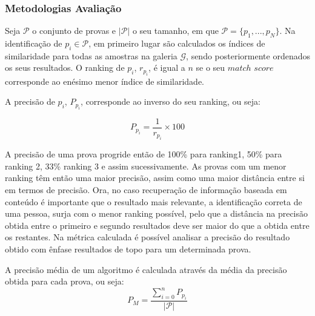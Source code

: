 \subsubsection{Metodologias Avaliação}
Seja $\mathscr{P}$ o conjunto de provas e $|\mathscr{P}|$ o seu tamanho, em que $\mathscr{P} = \{p_1, ..., p_N\}$. Na identificação de $p_i \in \mathscr{P}$, em primeiro lugar são calculados os índices de similaridade para todas as amostras na galeria $\mathscr{G}$, sendo posteriormente ordenados os seus resultados. O ranking de $p_i$, $r_{p_i}$, é igual a $n$ se o seu $match$ $score$ corresponde ao enésimo menor índice de similaridade.

A precisão de $p_i$, $P_{p_i}$, corresponde ao inverso do seu ranking, ou seja:

\begin{equation}
P_{p_i} = \frac{1}{r_{p_i}} \times 100
\end{equation}

A precisão de uma prova progride então de 100\% para ranking1, 50\% para ranking 2, 33\% ranking 3 e assim sucessivamente. As provas com um menor ranking têm então uma maior precisão, assim como uma maior distância entre si em termos de precisão. Ora, no caso recuperação de informação baseada em conteúdo é importante que o resultado mais relevante, a identificação correta de uma pessoa, surja com o menor ranking possível, pelo que a distância na precisão obtida entre o primeiro e segundo resultados deve ser maior do que a obtida entre os restantes. Na métrica calculada é possível analisar a precisão do resultado obtido com ênfase resultados de topo para um determinada prova.

A precisão média de um algoritmo é calculada através da média da precisão obtida para cada prova, ou seja:
\begin{equation}
P_M = \frac{ \sum\limits_{i=0}^{n} P_{p_i} }{|\mathscr{P}|}
\end{equation}

